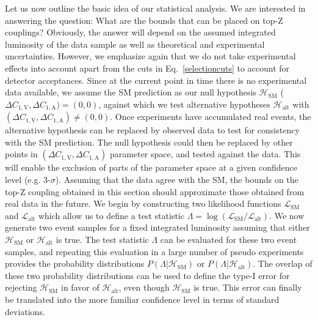 \documentclass[preprint]{JHEP3}
\newcommand{\SM}{\mathrm{SM}}
\newcommand{\alt}{\mathrm{alt}}
\def\DConeA{\Delta C_{1,\mathrm{A}}}
\def\DConeV{\Delta C_{1,\mathrm{V}}}
\def\Halt{\mathcal{H}_{\mathrm{alt}}}
\begin{document}
Let us now outline the basic idea of our statistical analysis.
We are interested in answering the question: What are the bounds that can be placed on top-Z couplings? 
Obviously, the answer will depend on the assumed integrated luminosity of the data sample as well as theoretical and experimental uncertainties. 
However, we emphasize again that we do not take experimental effects into account apart from the cuts in Eq.~\ref{selectioncuts} to account for detector acceptances.
Since at the current point in time there is no experimental data available, we assume the SM prediction as our null hypothesis 
$\mathcal{H}_{\mathrm{SM}}$ ($\DConeV,\DConeA)=(0,0)$,
against which we test alternative hypotheses $\Halt$ with $(\DConeV,\DConeA) \ne (0,0)$.
Once experiments have accumulated real events, the alternative hypothesis can be replaced by observed data to test for consistency with the SM prediction. 
The null hypothesis could then be replaced by  other points in $(\DConeV,\DConeA)$ parameter space, and tested against the data. 
This will enable the exclusion of parts of the parameter space at a given confidence level (e.g. 3-$\sigma$). 
Assuming that the data agree with the SM, 
the bounds on the top-Z coupling 
obtained in this section should approximate those obtained from real data in the future. 
We begin by constructing two likelihood functions $\mathcal{L}_{\SM}$ and $\mathcal{L}_{\alt}$ which allow us to define a test 
statistic $\Lambda = \log \left( \mathcal{L}_{\SM} / \mathcal{L}_{\alt} \right)$.
We now generate two event samples for a fixed integrated luminosity assuming that either $\mathcal{H}_{\mathrm{SM}}$ or $\Halt$ is true.
The test statistic $\Lambda$ can be evaluated for these two event samples, and 
repeating this evaluation in a large number of pseudo experiments provides the probability distributions $P(\Lambda|\mathcal{H}_{\mathrm{SM}})$ or $P(\Lambda|\Halt)$.
The overlap of these two probability distributions can be used to define the type-I error for rejecting $\mathcal{H}_{\mathrm{SM}}$ in favor of $\Halt$, even though $\mathcal{H}_{\mathrm{SM}}$ is true.
This error can finally be translated into the more familiar confidence level in terms of standard deviations.
\end{document}
